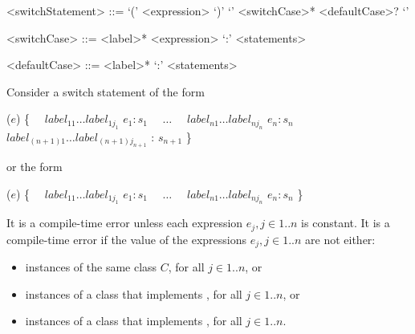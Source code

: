 \documentclass[makeidx]{article}
\begin{document}
{\begin{grammar}
<switchStatement> ::= \gnewline{}
  \SWITCH{} `(' <expression> `)' `{' <switchCase>* <defaultCase>? `}'

<switchCase> ::= <label>* \CASE{} <expression> `:' <statements>

<defaultCase> ::= <label>* \DEFAULT{} `:' <statements>
\end{grammar}

\LMHash{}%
Consider a switch statement of the form

\begin{normativeDartCode}
\SWITCH{} ($e$) \{
\ \ $label_{11} \ldots label_{1j_1}$ \CASE{} $e_1: s_1$
\ \ $\ldots$
\ \ $label_{n1} \ldots label_{nj_n}$ \CASE{} $e_n: s_n$
\ \ $label_{(n+1)1} \ldots label_{(n+1)j_{n+1}}$ \DEFAULT{}: $s_{n+1}$
\}
\end{normativeDartCode}

\noindent
or the form

\begin{normativeDartCode}
\SWITCH{} ($e$) \{
\ \ $label_{11} \ldots label_{1j_1}$ \CASE{} $e_1: s_1$
\ \ $\ldots$
\ \ $label_{n1} \ldots label_{nj_n}$ \CASE{} $e_n: s_n$
\}
\end{normativeDartCode}


\LMHash{}%
It is a compile-time error unless each expression
$e_j, j \in 1 .. n$ is constant.
It is a compile-time error if the value of the expressions
$e_j, j \in 1 .. n$ are not either:
\begin{itemize}
\item instances of the same class $C$, for all $j \in 1 .. n$, or
\item instances of a class that implements ,
  for all $j \in 1 .. n$, or
\item instances of a class that implements ,
  for all $j \in 1 .. n$.
\end{itemize}


}
\end{document}

